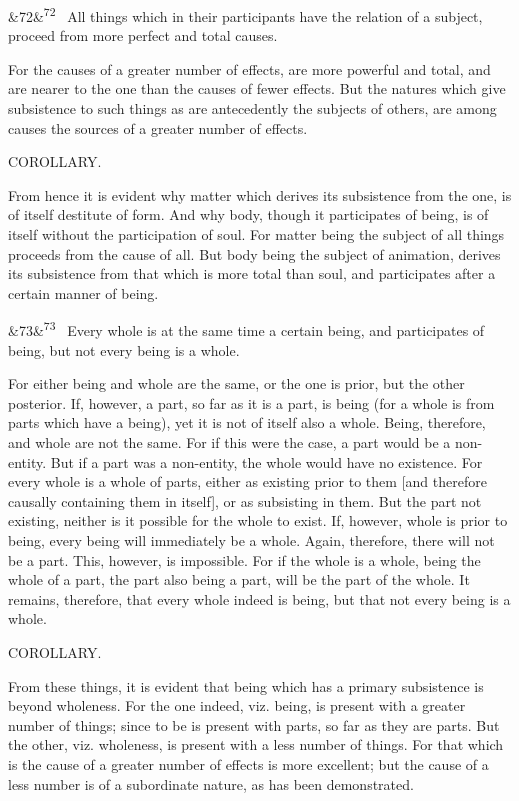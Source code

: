 \documentclass[12pt]{article}
\newcommand{\para}[1][]{\par\noindent\ifx&#1&\else\textsuperscript{\footnotesize #1}~\fi}
\begin{document}
\para[72] All things which in their participants have the relation of a subject, proceed from more perfect and total causes.

For the causes of a greater number of effects, are more powerful and total, and are nearer to the one than the causes of fewer effects. But the natures which give subsistence to such things as are antecedently the subjects of others, are among causes the sources of a greater number of effects.

COROLLARY.

From hence it is evident why matter which derives its subsistence from the one, is of itself destitute of form. And why body, though it participates of being, is of itself without the participation of soul. For matter being the subject of all things proceeds from the cause of all. But body being the subject of animation, derives its subsistence from that which is more total than soul, and participates after a certain manner of being.

\para[73] Every whole is at the same time a certain being, and participates of being, but not every being is a whole.

For either being and whole are the same, or the one is prior, but the other posterior. If, however, a part, so far as it is a part, is being (for a whole is from parts which have a being), yet it is not of itself also a whole. Being, therefore, and whole are not the same. For if this were the case, a part would be a non-entity. But if a part was a non-entity, the whole would have no existence. For every whole is a whole of parts, either as existing prior to them [and therefore causally containing them in itself], or as subsisting in them. But the part not existing, neither is it possible for the whole to exist. If, however, whole is prior to being, every being will immediately be a whole. Again, therefore, there will not be a part. This, however, is impossible. For if the whole is a whole, being the whole of a part, the part also being a part, will be the part of the whole. It remains, therefore, that every whole indeed is being, but that not every being is a whole.

COROLLARY.

From these things, it is evident that being which has a primary subsistence is beyond wholeness. For the one indeed, viz. being, is present with a greater number of things; since to be is present with parts, so far as they are parts. But the other, viz. wholeness, is present with a less number of things. For that which is the cause of a greater number of effects is more excellent; but the cause of a less number is of a subordinate nature, as has been demonstrated.
\end{document}
